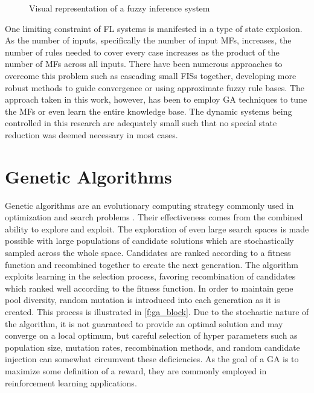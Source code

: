 \begin{figure}[ht]
    \centering
    
    \caption{Visual representation of a fuzzy inference system}\label{f:fis_block}
\end{figure}

One limiting constraint of FL systems is manifested in a type of state explosion. As the number of inputs,
specifically the number of input MFs, increases, the number of rules needed to cover every case increases as
the product of the number of MFs across all inputs. There have been numerous approaches to overcome this
problem such as cascading small FISs together\cite{ernest2015genetic}, developing more robust methods to guide
convergence\cite{hansen1997convergence} or using approximate fuzzy rule bases\cite{cordon:01bk}. The approach
taken in this work, however, has been to employ GA techniques to tune the MFs or even learn the entire
knowledge base. The dynamic systems being controlled in this research are adequately small such that no
special state reduction was deemed necessary in most cases.

\section{Genetic Algorithms}
Genetic algorithms are an evolutionary computing strategy commonly used in optimization and search problems
\cite{bodenhofer1997ten}. Their effectiveness comes from the combined ability to explore and exploit. The
exploration of even large search spaces is made possible with large populations of candidate solutions which
are stochastically sampled across the whole space. Candidates are ranked according to a fitness function and
recombined together to create the next generation. The algorithm exploits learning in the selection process,
favoring recombination of candidates which ranked well according to the fitness function. In order to maintain
gene pool diversity, random mutation is introduced into each generation as it is created. This process is
illustrated in \cref{f:ga_block}. Due to the stochastic nature of the algorithm, it is not guaranteed to
provide an optimal solution and may converge on a local optimum, but careful selection of hyper parameters
such as population size, mutation rates, recombination methods, and random candidate injection can  somewhat
circumvent these deficiencies. As the goal of a GA is to maximize some definition of a reward, they are
commonly employed in reinforcement learning applications\cite{salimans2017evolution}.

